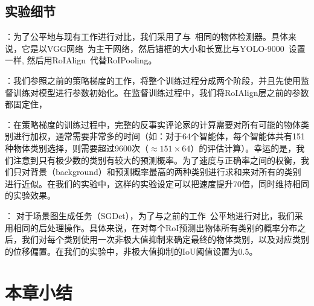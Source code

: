 \subsection{实验细节}


：为了公平地与现有工作进行对比，我们采用了与~\cite{zellers2018neural}相同的物体检测器。具体来说，它是以VGG网络~\cite{simonyan2015very}为主干网络，然后锚框的大小和长宽比与YOLO-9000~\cite{redmon2017yolo9000}设置一样, 然后用RoIAlign~\cite{he2017mask}代替RoIPooling。


：我们参照之前的策略梯度的工作，将整个训练过程分成两个阶段，并且先使用监督训练对模型进行参数初始化。在监督训练过程中，我们将RoIAlign层之前的参数都固定住，


：在策略梯度的训练过程中，完整的反事实评论家的计算需要对所有可能的物体类别进行加权，通常需要非常多的时间（如：对于64个智能体，每个智能体共有151种物体类别选择，则需要超过9600次（$\approx 151 \times 64$）的评估计算）。幸运的是，我们注意到只有极少数的类别有较大的预测概率。为了速度与正确率之间的权衡，我们只对背景（background）和预测概率最高的两种类别进行求和来对所有的类别进行近似。在我们的实验中，这样的实验设定可以把速度提升70倍，同时维持相同的实验效果。


： 对于场景图生成任务（SGDet），为了与之前的工作~\cite{zellers2018neural,zhang2019graphical}公平地进行对比，我们采用相同的后处理操作。具体来说，在对每个RoI预测出物体所有类别的概率分布之后，我们对每个类别使用一次非极大值抑制来确定最终的物体类别，以及对应类别的位移偏置。在我们的实验中，非极大值抑制的IoU阈值设置为0.5。

\section{本章小结}